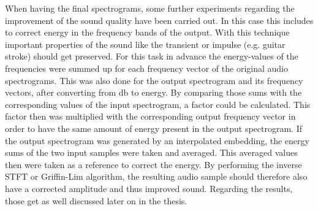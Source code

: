 When having the final spectrograms, some further experiments regarding the improvement of the sound quality have been carried out. In this case this includes to correct energy in the frequency bands of the output. With this technique important properties of the sound like the transient or impulse (e.g. guitar stroke) should get preserved. For this task in advance the energy-values of the frequencies were summed up for each frequency vector of the original audio spectrograms. This was also done for the output spectrogram and its frequency vectors, after converting from db to energy. By comparing those sums with the corresponding values of the input spectrogram, a factor could be calculated. This factor then was multiplied with the corresponding output frequency vector in order to have the same amount of energy present in the output spectrogram. If the output spectrogram was generated by an interpolated embedding, the energy sums of the two input samples were taken and averaged. This averaged values then were taken as a reference to correct the energy. By performing the inverse STFT or Griffin-Lim algorithm, the resulting audio sample should therefore also have a corrected amplitude and thus improved sound. Regarding the results, those get as well discussed later on in the thesis.


